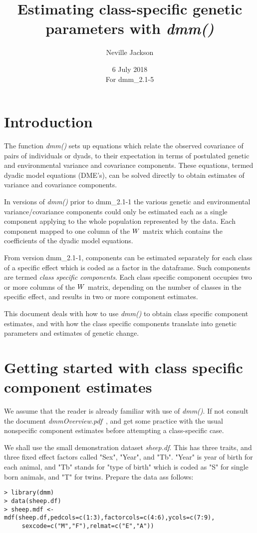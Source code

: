 \documentclass[titlepage]{article}  %
\title{ Estimating class-specific genetic parameters with {\em dmm()}}
\author{Neville Jackson }
\date{6 July 2018 \\
      For dmm\_2.1-5}   %
\begin{document}
 
 
\maketitle      
\tableofcontents

\section{Introduction} 
The function {\em dmm()} sets up equations which relate the observed covariance of pairs of individuals or dyads, to their expectation in terms of postulated genetic and environmental variance and covariance components.  These equations, termed dyadic model equations (DME's), can be solved directly to obtain estimates of variance and covariance components.  

In versions of {\em dmm()} prior to dmm\_2.1-1 the various genetic and environmental variance/covariance components could only be estimated each as a single component applying to the whole population represented by the data. Each component mapped to one column of the $\boldmath W$ matrix which contains the coefficients of the dyadic model equations.

From version dmm\_2.1-1, components can be estimated separately for each class of a specific effect which is coded as a factor in the dataframe. Such components are termed {\em class specific components}. Each class specific component occupies two or more columns of the $\boldmath W$ matrix, depending on the number of classes in the specific effect, and results in two or more component estimates.

This document deals with how to use {\em dmm()} to obtain class specific component estimates, and with how the class specific components translate into genetic parameters and estimates of genetic change.


 
\section{Getting started with class specific component estimates}
\label{sec:getstart}
 We assume that the reader is already familiar with use of {\em dmm()}. If not consult the document {\em dmmOverview.pdf}~\cite{jack:15}, and get some practice with the usual nonspecific component estimates before attempting a class-specific case.

 We shall use the small demonstration dataset {\em sheep.df}. This has three traits, and three fixed effect factors called "Sex", "Year", and "Tb". "Year" is year of birth for each animal, and "Tb" stands for "type of birth" which is coded as "S" for single born animals, and "T" for twins.  Prepare the data ass follows:
\begin{verbatim}
> library(dmm)
> data(sheep.df)
> sheep.mdf <- mdf(sheep.df,pedcols=c(1:3),factorcols=c(4:6),ycols=c(7:9),
     sexcode=c("M","F"),relmat=c("E","A"))
\end{verbatim}
\end{document}
